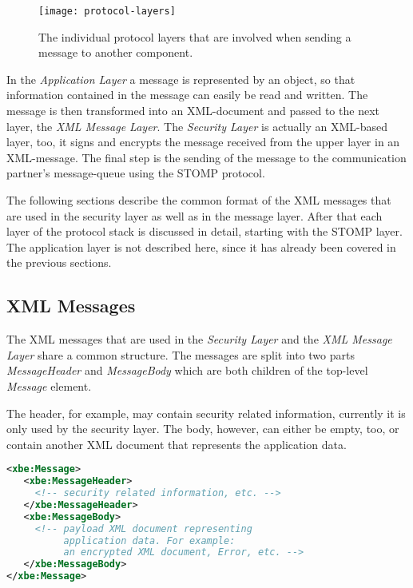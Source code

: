 \begin{figure}[ht]
  \centering
  \texttt{[image: protocol-layers]}
  \caption[Protocol  Layers]{The  individual   protocol  layers  that  are
    involved when sending a message to another component.}
  \label{fig:communication-layers}
\end{figure}

In the \emph{Application Layer} a  message is represented by an object, so
that information contained in the  message can easily be read and written.
The message  is then  transformed into an  XML-document and passed  to the
next layer, \ie the \emph{XML Message Layer}. The \emph{Security Layer} is
actually  an XML-based  layer,  too,  it signs  and  encrypts the  message
received from  the upper layer in  an XML-message.  The final  step is the
sending of the message  to the communication partner's message-queue using
the STOMP protocol.

\medskip

The following sections describe the common format of the XML messages that
are used in the security layer as well as in the message layer. After that
each layer of the protocol stack is discussed in detail, starting with the
STOMP layer.  The application  layer is not  described here, since  it has
already been covered in the previous sections.

\subsection{XML Messages}

The  XML messages  that  are used  in  the \emph{Security  Layer} and  the
\emph{XML Message Layer} share a  common structure. The messages are split
into two parts \emph{MessageHeader}  and \emph{MessageBody} which are both
children of the top-level \emph{Message} element.

The  header,  for  example,  may  contain  security  related  information,
currently it is  only used by the security layer.   The body, however, can
either be empty, too, or  contain another XML document that represents the
application data.

\medskip
\begin{center}
  \begin{minipage}{.75\textwidth}
    \begin{lstlisting}[captionpos=b,backgroundcolor=\color{listingcolor},frame=lines,numbers=none,stepnumber=5,numberfirstline=false,numberstyle=\tiny,caption={The
        structure of an XML message.},label={lst:xml-message-example},language=XML]
<xbe:Message>
   <xbe:MessageHeader>
     <!-- security related information, etc. -->
   </xbe:MessageHeader>
   <xbe:MessageBody>
     <!-- payload XML document representing
          application data. For example:
          an encrypted XML document, Error, etc. -->
   </xbe:MessageBody>
</xbe:Message>
    \end{lstlisting}
  \end{minipage}
\end{center}

